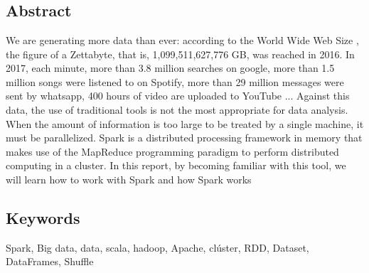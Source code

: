 \chapter*{}

\section*{Abstract}

We are generating more data than ever: according to the World Wide Web Size , the figure of a Zettabyte, that is, 1,099,511,627,776 GB, was reached in 2016. In 2017, each minute, more than 3.8 million searches on google, more than 1.5 million songs were listened to on Spotify, more than 29 million messages were sent by whatsapp, 400 hours of video are uploaded to YouTube ... Against this data, the use of traditional tools is not the most appropriate for data analysis.\\

When the amount of information is too large to be treated by a single machine, it must be parallelized. Spark is a distributed processing framework in memory that makes use of the MapReduce programming paradigm to perform distributed computing in a cluster. In this report, by becoming familiar with this tool, we will learn how to work with Spark and how Spark works


\section*{Keywords}
Spark, Big data, data, scala, hadoop, Apache, clúster, RDD, Dataset, DataFrames, Shuffle